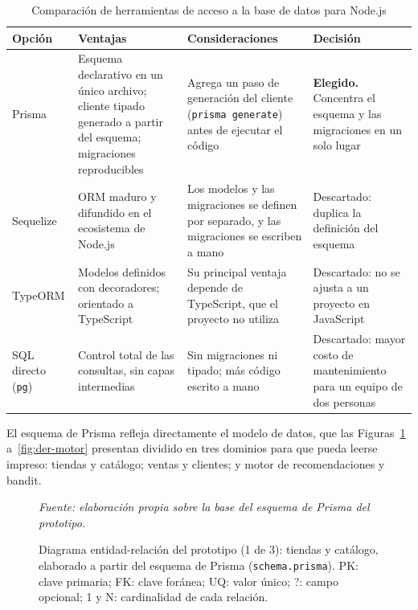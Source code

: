 \begin{table}[h]
\centering
\caption{Comparación de herramientas de acceso a la base de datos para Node.js}
\label{tab:comparativo_orm}
\renewcommand{\arraystretch}{1.3}
\begin{tabular}{|m{2.3cm}|m{4.4cm}|m{4.4cm}|m{3.4cm}|}
\hline
\textbf{Opción} & \textbf{Ventajas} & \textbf{Consideraciones} & \textbf{Decisión} \\
\hline
Prisma & Esquema declarativo en un único archivo; cliente tipado generado a partir del esquema; migraciones reproducibles & Agrega un paso de generación del cliente (\texttt{prisma generate}) antes de ejecutar el código & \textbf{Elegido.} Concentra el esquema y las migraciones en un solo lugar \\
\hline
Sequelize & ORM maduro y difundido en el ecosistema de Node.js & Los modelos y las migraciones se definen por separado, y las migraciones se escriben a mano & Descartado: duplica la definición del esquema \\
\hline
TypeORM & Modelos definidos con decoradores; orientado a TypeScript & Su principal ventaja depende de TypeScript, que el proyecto no utiliza & Descartado: no se ajusta a un proyecto en JavaScript \\
\hline
SQL directo (\texttt{pg}) & Control total de las consultas, sin capas intermedias & Sin migraciones ni tipado; más código escrito a mano & Descartado: mayor costo de mantenimiento para un equipo de dos personas \\
\hline
\end{tabular}
\end{table}

El esquema de Prisma refleja directamente el modelo de datos, que las Figuras~\ref{fig:der-catalogo} a~\ref{fig:der-motor} presentan dividido en tres dominios para que pueda leerse impreso: tiendas y catálogo; ventas y clientes; y motor de recomendaciones y bandit.

\begin{figure}[!htbp]
    \centering
    
    \caption{Diagrama entidad-relación del prototipo (1 de 3): tiendas y catálogo, elaborado a partir del esquema de Prisma (\texttt{schema.prisma}). PK: clave primaria; FK: clave foránea; UQ: valor único; ?: campo opcional; 1 y N: cardinalidad de cada relación.}
    \label{fig:der-catalogo}

    \smallskip
    \noindent\textit{Fuente: elaboración propia sobre la base del esquema de Prisma del prototipo.}
\end{figure}

